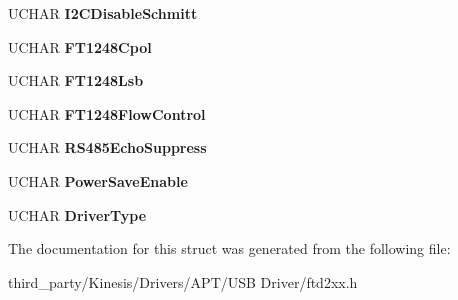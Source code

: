 \begin{DoxyCompactItemize}
\item 
U\+C\+H\+AR {\bfseries I2\+C\+Disable\+Schmitt}\hypertarget{structft__eeprom__x__series_a1273bf5d26c7ef2f905ce6a1b3d936b4}{}\label{structft__eeprom__x__series_a1273bf5d26c7ef2f905ce6a1b3d936b4}

\item 
U\+C\+H\+AR {\bfseries F\+T1248\+Cpol}\hypertarget{structft__eeprom__x__series_aad1d7a7df7f73970d4fcb1d59a22c259}{}\label{structft__eeprom__x__series_aad1d7a7df7f73970d4fcb1d59a22c259}

\item 
U\+C\+H\+AR {\bfseries F\+T1248\+Lsb}\hypertarget{structft__eeprom__x__series_aed8eaabb6019562d67ab10a65d018376}{}\label{structft__eeprom__x__series_aed8eaabb6019562d67ab10a65d018376}

\item 
U\+C\+H\+AR {\bfseries F\+T1248\+Flow\+Control}\hypertarget{structft__eeprom__x__series_a41a97bfe47b52d3143f6e6a3c833da03}{}\label{structft__eeprom__x__series_a41a97bfe47b52d3143f6e6a3c833da03}

\item 
U\+C\+H\+AR {\bfseries R\+S485\+Echo\+Suppress}\hypertarget{structft__eeprom__x__series_a1c3a9dc30091091132b7ec653676f589}{}\label{structft__eeprom__x__series_a1c3a9dc30091091132b7ec653676f589}

\item 
U\+C\+H\+AR {\bfseries Power\+Save\+Enable}\hypertarget{structft__eeprom__x__series_adb0618ee1305d47abec850be8f315ed4}{}\label{structft__eeprom__x__series_adb0618ee1305d47abec850be8f315ed4}

\item 
U\+C\+H\+AR {\bfseries Driver\+Type}\hypertarget{structft__eeprom__x__series_a9379ff3b9473a839ebd27a753c3c1b60}{}\label{structft__eeprom__x__series_a9379ff3b9473a839ebd27a753c3c1b60}

\end{DoxyCompactItemize}


The documentation for this struct was generated from the following file\+:\begin{DoxyCompactItemize}
\item 
third\+\_\+party/\+Kinesis/\+Drivers/\+A\+P\+T/\+U\+S\+B Driver/ftd2xx.\+h\end{DoxyCompactItemize}
